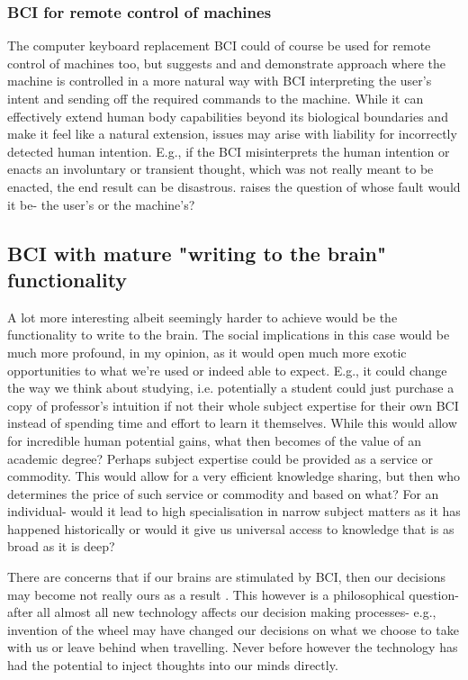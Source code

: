 \documentclass[fleqn,11pt]{olplainarticle}
\begin{document}
\subsubsection{BCI for remote control of machines}
The computer keyboard replacement BCI could of course be used for remote control of machines too, but \cite{schalk2008brain} suggests and \cite{warwick2003cyborg} and \cite{wakefield_2020} demonstrate approach where the machine is controlled in a more natural way with BCI interpreting the user's intent and sending off the required commands to the machine. While it can effectively extend human body capabilities beyond its biological boundaries and make it feel like a natural extension, issues may arise with liability for incorrectly detected human intention. E.g., if the BCI misinterprets the human intention or enacts an involuntary or transient thought, which was not really meant to be enacted, the end result can be disastrous. \cite{schalk2008brain} raises the question of whose fault would it be- the user's or the machine's? 

\subsection{BCI with mature "writing to the brain" functionality}
A lot more interesting albeit seemingly harder to achieve would be the functionality to write to the brain. The social implications in this case would be much more profound, in my opinion, as it would open much more exotic opportunities to what we're used or indeed able to expect. E.g., it could change the way we think about studying, i.e. potentially a student could just purchase a copy of professor's intuition if not their whole subject expertise for their own BCI instead of spending time and effort to learn it themselves. While this would allow for incredible human potential gains, what then becomes of the value of an academic degree? Perhaps subject expertise could be provided as a service or commodity. This would allow for a very efficient knowledge sharing, but then who determines the price of such service or commodity and based on what? For an individual- would it lead to high specialisation in narrow subject matters as it has happened historically or would it give us universal access to knowledge that is as broad as it is deep? 

There are concerns that if our brains are stimulated by BCI, then our decisions may become not really ours as a result \cite{kogel2019using}. This however is a philosophical question- after all almost all new technology affects our decision making processes- e.g., invention of the wheel may have changed our decisions on what we choose to take with us or leave behind when travelling. Never before however the technology has had the potential to inject thoughts into our minds directly.
\end{document}
